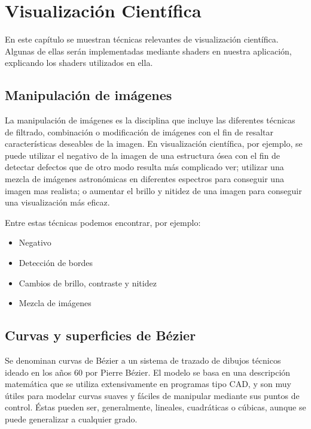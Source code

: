\cleardoublepage

\chapter{Visualización Científica}
\label{makereference4}

En este capítulo se muestran técnicas relevantes de visualización científica.
Algunas de ellas serán implementadas mediante shaders en nuestra aplicación,
explicando los shaders utilizados en ella.

\section{Manipulación de imágenes}
\label{ref:images}


La manipulación de imágenes es la disciplina que incluye las diferentes técnicas
de filtrado, combinación o modificación de imágenes con el fin de resaltar
características deseables de la imagen. En visualización científica, por
ejemplo, se puede utilizar el negativo de la imagen de una estructura ósea con
el fin de detectar defectos que de otro modo resulta más complicado ver;
utilizar una mezcla de imágenes astronómicas en diferentes espectros para
conseguir una imagen mas realista; o aumentar el brillo y nitidez de una imagen
para conseguir una visualización más eficaz. 

Entre estas técnicas podemos encontrar, por ejemplo:

\begin{itemize}
		\item Negativo
		\item Detección de bordes
		\item Cambios de brillo, contraste y nitidez
		\item Mezcla de imágenes
\end{itemize}

\section{Curvas y superficies de Bézier}
\label{ref:bezier}

Se denominan curvas de Bézier a un sistema de trazado de dibujos técnicos ideado
en los años 60 por Pierre Bézier. El modelo se basa en una descripción
matemática que se utiliza extensivamente en programas tipo CAD, y son muy útiles
para modelar curvas suaves y fáciles de manipular mediante sus puntos de
control. Éstas pueden ser, generalmente, lineales, cuadráticas o cúbicas, aunque
se puede generalizar a cualquier grado. 

